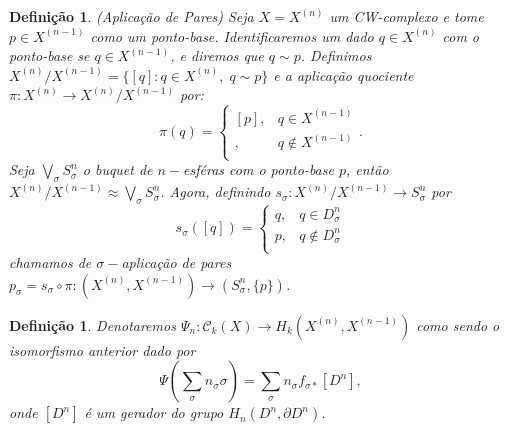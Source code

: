 \documentclass[12pt]{book}
\newtheorem{definicao}[teorema]{Definição}
\newcommand{\celula}[2]{D^{#1}_{#2}}
\newcommand{\classe}[1]{[#1]}
\newcommand{\funcaocond}[5]{
	#1 = 
	\left\{
	\begin{array}{cc}
		#2, & #3\\
		#4, & #5\\
	\end{array}
	\right.
}
\newcommand{\homologiarelcel}[3]{H_{#1}(D^{#2}_{#3}, \partial D^{#2}_{#3})}
\newcommand{\homologiarelskelesimpl}[2]{H_{#1}(X^{(#2)}, X^{(#2-1)})}
\newcommand{\skeleton}[1]{X^{(#1)}}
\begin{document}
	\begin{definicao}
		(Aplicação de Pares) Seja $X = \skeleton{n}$ um CW-complexo e tome $p \in \skeleton{n-1}$ como um ponto-base. Identificaremos um dado $q \in \skeleton{n}$ com o ponto-base se $q \in \skeleton{n-1}$, e diremos que $q \sim p$. Definimos $\skeleton{n}/\skeleton{n-1} = \{[q]: q \in \skeleton{n}, \; q \sim p\}$ e a aplicação quociente $\pi : \skeleton{n} \to \skeleton{n}/\skeleton{n-1}$ por:
		$$
		\pi(q) = 
		\left\{
		\begin{array}{cc}
		\classe{p}, & q \in \skeleton{n-1}\\
		\classe{q}, & q \notin \skeleton{n-1}\\
		\end{array}
		\right..
		$$
		Seja $\bigvee_{\sigma} S^{n}_{\sigma}$ o buquet de $n-$esféras com o ponto-base $p$, então $\skeleton{n}/\skeleton{n-1} \approx \bigvee_{\sigma} S^{n}_{\sigma}$. Agora, definindo $s_{\sigma} : \skeleton{n}/\skeleton{n-1} \to S^{n}_{\sigma}$ por 
		$$
		\funcaocond{s_{\sigma}([q])}{q}{q \in \celula{n}{\sigma}}{p}{q \notin \celula{n}{\sigma}}
		$$
		chamamos de $\sigma-$aplicação de pares $p_{\sigma} = s_{\sigma} \circ \pi : (\skeleton{n}, \skeleton{n-1}) \to (S^{n}_{\sigma}, \{p\})$.
	\end{definicao}
	
	\begin{definicao}
		Denotaremos $\Psi_{n}:\mathcal{C}_{k}(X) \to \homologiarelskelesimpl{k}{n}$ como sendo o isomorfismo anterior dado por 
		$$
		\Psi(\sum_{\sigma} n_{\sigma} \sigma) = \sum_{\sigma} n_{\sigma} f_{\sigma *}[D^{n}],
		$$
		onde $[D^{n}]$ é um gerador do grupo $\homologiarelcel{n}{n}{}$.
	\end{definicao}
\end{document}
